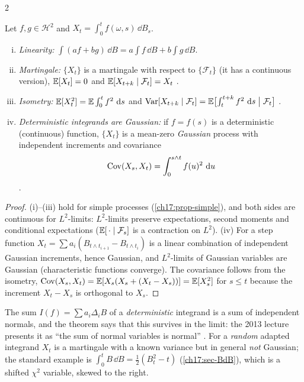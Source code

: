 \begin{paracol}{2}
\begin{theorem}\label{ch17:thm-ito-int}
Let $f,g\in\mathcal H^2$ and $X_t=\int_0^tf(\omega,s)\,\dd B_s$.
\begin{enumerate}[(i)]
  \item \emph{Linearity:} $\int(af+bg)\,\dd B=a\int f\,\dd B+b\int g\,\dd B$.
  \item \emph{Martingale:} $\{X_t\}$ is a martingale with respect to $\{\mathcal F_t\}$ (it has a continuous version), $\mathbb{E}[X_t]=0$ and
        $\mathbb{E}[X_{t+k}\mid\mathcal F_t]=X_t$ .
  \item \emph{Isometry:} $\mathbb{E}[X_t^2]=\mathbb{E}\int_0^tf^2\,\,\mathrm{d} s$ and
        $\operatorname{Var}[X_{t+k}\mid\mathcal F_t]=\mathbb{E}\bigl[\int_t^{t+k}f^2\,\,\mathrm{d} s\bigm|\mathcal F_t\bigr]$ .
  \item \emph{Deterministic integrands are Gaussian:} if $f=f(s)$ is a deterministic (continuous) function, $\{X_t\}$ is a mean-zero \emph{Gaussian}
        process with independent increments and covariance
        \[
          \operatorname{Cov}(X_s,X_t)=\int_0^{s\wedge t}f(u)^2\,\,\mathrm{d} u
        \]
        .
\end{enumerate}
\end{theorem}
\begin{proof}
(i)--(iii) hold for simple processes (\cref{ch17:prop-simple}), and both sides are continuous for $L^2$-limits: $L^2$-limits preserve expectations,
second moments and conditional expectations ($\mathbb{E}[\,\cdot\mid\mathcal F_s]$ is a contraction on $L^2$). (iv) For a step function
$X_t=\sum a_i(B_{t\wedge t_{i+1}}-B_{t\wedge t_i})$ is a linear combination of independent Gaussian increments, hence Gaussian, and
$L^2$-limits of Gaussian variables are Gaussian (characteristic functions converge). The covariance follows from the isometry,
$\operatorname{Cov}(X_s,X_t)=\mathbb{E}[X_s(X_s+(X_t-X_s))]=\mathbb{E}[X_s^2]$ for $s\le t$ because the increment $X_t-X_s$ is orthogonal to $X_s$.
\end{proof}

The sum $I(f)=\sum a_i\Delta_iB$ of a \emph{deterministic} integrand is a sum of independent normals, and the theorem says that this survives in the limit: the
2013 lecture presents it as ``the sum of normal variables is normal'' . For a \emph{random} adapted integrand
$X_t$ is a martingale with a known variance but in general \emph{not} Gaussian; the standard example is
$\int_0^tB\,\dd B=\tfrac12(B_t^2-t)$ (\cref{ch17:sec-BdB}), which is a shifted $\chi^2$ variable, skewed to the right.


\end{paracol}
